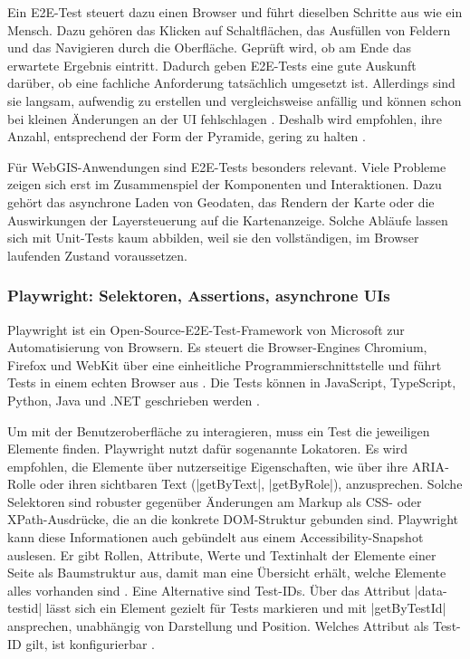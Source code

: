 Ein \ac{E2E}-Test steuert dazu einen Browser und führt dieselben Schritte aus wie ein Mensch. Dazu gehören das Klicken auf Schaltflächen, das Ausfüllen von Feldern und das Navigieren durch die Oberfläche. Geprüft wird, ob am Ende das erwartete Ergebnis eintritt. Dadurch geben \ac{E2E}-Tests eine gute Auskunft darüber, ob eine fachliche Anforderung tatsächlich umgesetzt ist. Allerdings sind sie langsam, aufwendig zu erstellen und vergleichsweise anfällig und können schon bei kleinen Änderungen an der \ac{UI} fehlschlagen \parencite{fowler_test_2012}. Deshalb wird empfohlen, ihre Anzahl, entsprechend der Form der Pyramide, gering zu halten \parencite{poenisch_testpyramide_2022}.

Für WebGIS-Anwendungen sind \ac{E2E}-Tests besonders relevant. Viele Probleme zeigen sich erst im Zusammenspiel der Komponenten und Interaktionen. Dazu gehört das asynchrone Laden von Geodaten, das Rendern der Karte oder die Auswirkungen der Layersteuerung auf die Kartenanzeige. Solche Abläufe lassen sich mit Unit-Tests kaum abbilden, weil sie den vollständigen, im Browser laufenden Zustand voraussetzen.

\subsubsection{Playwright: Selektoren, Assertions, asynchrone UIs}

Playwright ist ein Open-Source-\ac{E2E}-Test-Framework von Microsoft zur Automatisierung von Browsern. Es steuert die Browser-Engines Chromium, Firefox und WebKit über eine einheitliche Programmierschnittstelle und führt Tests in einem echten Browser aus \parencite[Playwright]{microsoft_fast_nodate}. Die Tests können in JavaScript, TypeScript, Python, Java und .NET geschrieben werden \parencite[Supported languages]{microsoft_supported_nodate}.

Um mit der Benutzeroberfläche zu interagieren, muss ein Test die jeweiligen Elemente finden. Playwright nutzt dafür sogenannte Lokatoren. Es wird empfohlen, die Elemente über nutzerseitige Eigenschaften, wie über ihre \ac{ARIA}-Rolle oder ihren sichtbaren Text (\code|getByText|, \code|getByRole|), anzusprechen. Solche Selektoren sind robuster gegenüber Änderungen am Markup als \ac{CSS}- oder XPath-Ausdrücke, die an die konkrete \ac{DOM}-Struktur gebunden sind. Playwright kann diese Informationen auch gebündelt aus einem Accessibility-Snapshot auslesen. Er gibt Rollen, Attribute, Werte und Textinhalt der Elemente einer Seite als Baumstruktur aus, damit man eine Übersicht erhält, welche Elemente alles vorhanden sind \parencite[Snapshot testing]{microsoft_snapshot_nodate}. Eine Alternative sind Test-IDs. Über das Attribut \code|data-testid| lässt sich ein Element gezielt für Tests markieren und mit \code|getByTestId| ansprechen, unabhängig von Darstellung und Position. Welches Attribut als Test-ID gilt, ist konfigurierbar \parencite[Locators]{microsoft_locators_nodate}.

